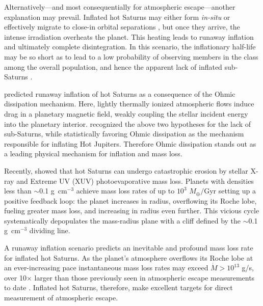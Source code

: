 \documentclass[twocolumn]{aastex631}
\begin{document}
Alternatively---and most consequentially for atmospheric escape---another explanation may prevail.  Inflated hot Saturns may either form \emph{in-situ} or effectively migrate to close-in orbital separations \citep{2018ARA&A..56..175D}, but once they arrive, the intense irradiation overheats the planet.  This heating leads to runaway inflation and ultimately complete disintegration.  In this scenario, the inflationary half-life may be so short as to lead to a low probability of observing members in the class among the overall population, and hence the apparent lack of inflated sub-Saturns \citep{2023ApJ...945L..36T}.

\citet{2011ApJ...738....1B} predicted runaway inflation of hot Saturns as a consequence of the Ohmic dissipation mechanism.  Here, lightly thermally ionized atmospheric flows induce drag in a planetary magnetic field, weakly coupling the stellar incident energy into the planetary interior.  \citet{2018AJ....155..214T} recognized the above two hypotheses for the lack of sub-Saturns, while statistically favoring Ohmic dissipation as the mechanism responsible for inflating Hot Jupiters.  Therefore Ohmic dissipation stands out as a leading physical mechanism for inflation and mass loss.

Recently, \citet{2023ApJ...945L..36T} showed that hot Saturns can undergo catastrophic erosion by stellar X-ray and Extreme UV (XUV) photoevaporative mass loss. Planets with densities less than $\sim$0.1 g~cm$^{-3}$ achieve mass loss rates of up to $10^3$ $M_\oplus /$Gyr setting up a positive feedback loop: the planet increases in radius, overflowing its Roche lobe, fueling greater mass loss, and increasing in radius even further.  This vicious cycle systematically depopulates the mass-radius plane with a cliff defined by the $\sim$0.1 g~cm$^{-3}$ dividing line.

A runaway inflation scenario predicts an inevitable and profound mass loss rate for inflated hot Saturns.  As the planet's atmosphere overflows its Roche lobe at an ever-increasing pace instantaneous mass loss rates may exceed $\dot{M}>10^{13}$ g/s, over 10$\times$ larger than those previously seen in atmospheric escape measurements to date \citep{2022arXiv221116243D}.  Inflated hot Saturns, therefore, make excellent targets for direct measurement of atmospheric escape.  
\end{document}
